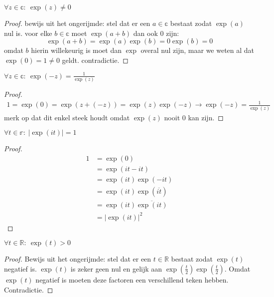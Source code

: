 \documentclass[main.tex]{subfiles}
\begin{document}
\begin{bpr}
  \label{pr:exp-nooit-nul}
  $\forall z \in \mathbb{c}:\ \exp(z) \neq 0$

  \begin{proof}
    bewijs uit het ongerijmde: stel dat er een $a\in \mathbb{c}$ bestaat zodat $\exp(a)$ nul is.
    voor elke $b\in \mathbb{c}$ moet $\exp(a+b)$ dan ook $0$ zijn:
    \[ \exp(a+b) = \exp(a)\exp(b) = 0\exp(b) = 0 \]
    omdat $b$ hierin willekeurig is moet dan $\exp$ overal nul zijn, maar we weten al dat $\exp(0) = 1 \neq 0$ geldt.
    contradictie.
  \end{proof}
\end{bpr}
\feed 

\begin{bpr}
  \label{pr:inverse-exponent}
  $\forall z \in \mathbb{c}:\ \exp(-z) = \frac{1}{\exp(z)}$

  \begin{proof}
    \begin{align*}
      1 = \exp(0)
      = \exp(z+(-z))
      = \exp(z)\exp(-z)
      \rightarrow
      \exp(-z)
      = \frac{1}{\exp(z)}
    \end{align*}
    merk op dat dit enkel steek houdt omdat $\exp(z)$ nooit $0$ kan zijn.
  \end{proof}
\end{bpr}

\begin{bpr}
  \label{pr:lengte-imaginaire-exponentiatie-1}
  $\forall t \in \mathbb{r}:\ |\exp(it)| = 1$

  \begin{proof}
    \begin{align*}
      1
      &= \exp(0)\\
      &= \exp(it-it)\\
      &= \exp(it)\exp(-it)\\
      &= \exp(it)\exp(\overline{it})\\
      &= \exp(it)\overline{\exp(it)}\\
      &= |\exp(it)|^{2}
    \end{align*}
  \end{proof}
\end{bpr}

\begin{bpr}
  \label{pr:reele-exponentiatie-positief}
  $\forall t \in \mathbb{R}:\ \exp(t) > 0$

  \begin{proof}
    Bewijs uit het ongerijmde: stel dat er een $t\in \mathbb{R}$ bestaat zodat $\exp(t)$ negatief is.
    $\exp(t)$ is zeker geen nul en gelijk aan $\exp\left(\frac{t}{2}\right)\exp\left(\frac{t}{2}\right)$.
    Omdat $\exp(t)$ negatief is moeten deze factoren een verschillend teken hebben.
    Contradictie.
  \end{proof}
\end{bpr}
  \feed
\end{document}
